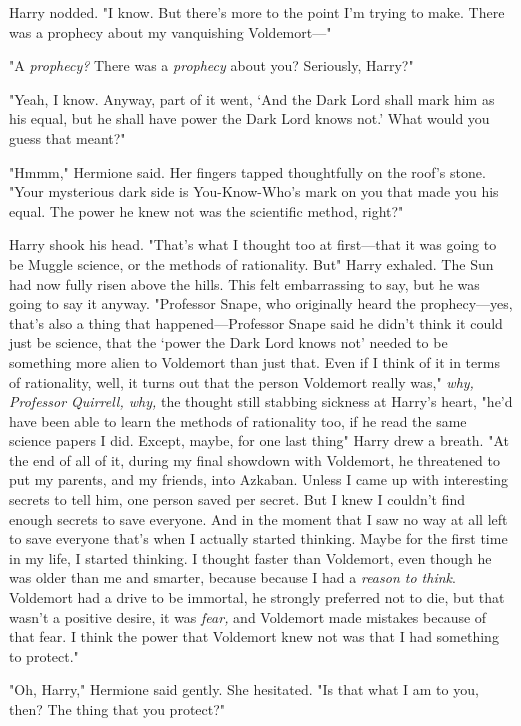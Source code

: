 Harry nodded. "I know. But there's more to the point I'm trying to make. There
was a prophecy about my vanquishing Voldemort\mbox{---}"

"A \emph{prophecy?} There was a \emph{prophecy} about you? Seriously, Harry?"

"Yeah, I know. Anyway, part of it went, `And the Dark Lord shall mark him as
his equal, but he shall have power the Dark Lord knows not.' What would you
guess that meant?"

"Hmmm," Hermione said. Her fingers tapped thoughtfully on the roof's stone.
"Your mysterious dark side is You-Know-Who's mark on you that made you his
equal. The power he knew not{\el} was the scientific method, right?"

Harry shook his head. "That's what I thought too at first---that it was going
to be Muggle science, or the methods of rationality. But{\el}" Harry
exhaled. The Sun had now fully risen above the hills. This felt embarrassing to
say, but he was going to say it anyway. "Professor Snape, who originally heard
the prophecy---yes, that's also a thing that happened---Professor Snape said he
didn't think it could just be science, that the `power the Dark Lord knows not'
needed to be something more alien to Voldemort than just that. Even if I think
of it in terms of rationality, well, it turns out that the person Voldemort
really was," \emph{why, Professor Quirrell, why,} the thought still stabbing
sickness at Harry's heart, "he'd have been able to learn the methods of
rationality too, if he read the same science papers I did. Except, maybe, for
one last thing{\el}" Harry drew a breath. "At the end of all of it, during
my final showdown with Voldemort, he threatened to put my parents, and my
friends, into Azkaban. Unless I came up with interesting secrets to tell him,
one person saved per secret. But I knew I couldn't find enough secrets to save
everyone. And in the moment that I saw no way at all left to save
everyone{\el} that's when I actually started thinking. Maybe for the first
time in my life, I started thinking. I thought faster than Voldemort, even
though he was older than me and smarter, because{\el} because I had a
\emph{reason to think}. Voldemort had a drive to be immortal, he strongly
preferred not to die, but that wasn't a positive desire, it was \emph{fear,}
and Voldemort made mistakes because of that fear. I think the power that
Voldemort knew not{\el} was that I had something to protect."

"Oh, Harry," Hermione said gently. She hesitated. "Is that what I am to you,
then? The thing that you protect?"

